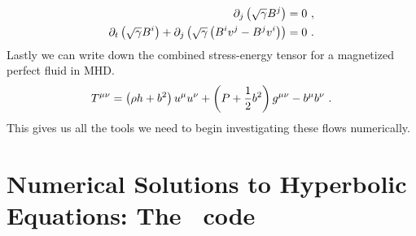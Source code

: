    \begin{align}
    	\partial_j \left( \sqrt{\gamma} B^j \right) &= 0 \ , \\
	\partial_t \left( \sqrt{\gamma} B^i \right) + \partial_j \left(\sqrt{\gamma}\left(B^i v^j - B^j v^i\right)\right) &= 0\ .
    \end{align}
    Lastly we can write down the combined stress-energy tensor for a magnetized perfect fluid in MHD.
    \begin{equation}
    	T^{\mu\nu} = \left(\rho h + b^2\right) u^\mu u^\nu + \left(P + \frac{1}{2}b^2\right)g^{\mu\nu} - b^\mu b^\nu \ . \eqlabel{TmunuGRMHD}
    \end{equation}
    This gives us all the tools we need to begin investigating these flows numerically.

\section{Numerical Solutions to Hyperbolic Equations: The \grdisco\ code}

